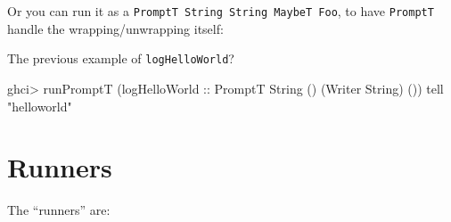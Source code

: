 \documentclass[]{article}
\newenvironment{Shaded}{}{}
\newcommand{\CommentTok}[1]{\textcolor[rgb]{0.38,0.63,0.69}{\textit{#1}}}
\newcommand{\DataTypeTok}[1]{\textcolor[rgb]{0.56,0.13,0.00}{#1}}
\newcommand{\DecValTok}[1]{\textcolor[rgb]{0.25,0.63,0.44}{#1}}
\newcommand{\NormalTok}[1]{#1}
\newcommand{\OperatorTok}[1]{\textcolor[rgb]{0.40,0.40,0.40}{#1}}
\newcommand{\OtherTok}[1]{\textcolor[rgb]{0.00,0.44,0.13}{#1}}
\newcommand{\StringTok}[1]{\textcolor[rgb]{0.25,0.44,0.63}{#1}}
\begin{document}
Or you can run it as a \texttt{PromptT\ String\ String\ MaybeT\ Foo}, to have
\texttt{PromptT} handle the wrapping/unwrapping itself:

\begin{Shaded}
\end{Shaded}

The previous example of \texttt{logHelloWorld}?

\begin{Shaded}
\begin{Highlighting}[]
\NormalTok{ghci}\OperatorTok{\textgreater{}}\NormalTok{ runPromptT (}\OtherTok{logHelloWorld ::} \DataTypeTok{PromptT} \DataTypeTok{String}\NormalTok{ () (}\DataTypeTok{Writer} \DataTypeTok{String}\NormalTok{) ()) tell}
\StringTok{"helloworld"}
\end{Highlighting}
\end{Shaded}

\section{Runners}\label{runners}

The ``runners'' are:
\end{document}
